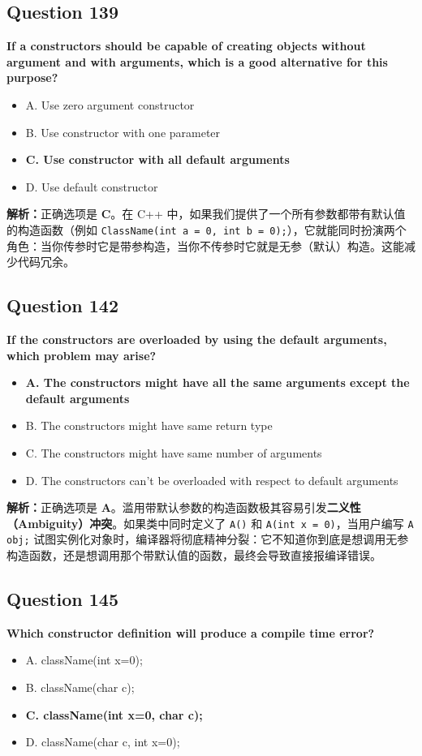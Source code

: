 \documentclass[11pt, a4paper]{article}
\begin{document}
\subsection*{Question 139}
\textbf{If a constructors should be capable of creating objects without argument and with arguments, which is a good alternative for this purpose?}
\begin{itemize}
    \item A. Use zero argument constructor
    \item B. Use constructor with one parameter
    \item \textbf{C. Use constructor with all default arguments}
    \item D. Use default constructor
\end{itemize}

\textbf{解析：}正确选项是 \textbf{C}。在 C++ 中，如果我们提供了一个所有参数都带有默认值的构造函数（例如 \texttt{ClassName(int a = 0, int b = 0);}），它就能同时扮演两个角色：当你传参时它是带参构造，当你不传参时它就是无参（默认）构造。这能减少代码冗余。


\subsection*{Question 142}
\textbf{If the constructors are overloaded by using the default arguments, which problem may arise?}
\begin{itemize}
    \item \textbf{A. The constructors might have all the same arguments except the default arguments}
    \item B. The constructors might have same return type
    \item C. The constructors might have same number of arguments
    \item D. The constructors can’t be overloaded with respect to default arguments
\end{itemize}

\textbf{解析：}正确选项是 \textbf{A}。滥用带默认参数的构造函数极其容易引发\textbf{二义性（Ambiguity）冲突}。如果类中同时定义了 \texttt{A()} 和 \texttt{A(int x = 0)}，当用户编写 \texttt{A obj;} 试图实例化对象时，编译器将彻底精神分裂：它不知道你到底是想调用无参构造函数，还是想调用那个带默认值的函数，最终会导致直接报编译错误。


\subsection*{Question 145}
\textbf{Which constructor definition will produce a compile time error?}
\begin{itemize}
    \item A. className(int x=0);
    \item B. className(char c);
    \item \textbf{C. className(int x=0, char c);}
    \item D. className(char c, int x=0);
\end{itemize}
\end{document}
